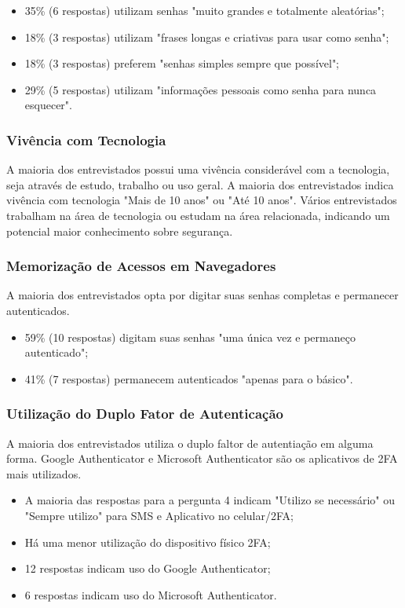 \documentclass[12pt]{article}
\begin{document}
\begin{itemize}
  \item 35\% (6 respostas) utilizam senhas "muito grandes e totalmente aleatórias";
  \item 18\% (3 respostas) utilizam "frases longas e criativas para usar como senha";
  \item 18\% (3 respostas) preferem "senhas simples sempre que possível";
  \item 29\% (5 respostas) utilizam "informações pessoais como senha para nunca esquecer".
\end{itemize}

\subsubsection{Vivência com Tecnologia}

A maioria dos entrevistados possui uma vivência considerável com a tecnologia, seja
através de estudo, trabalho ou uso geral.
A maioria dos entrevistados indica vivência com tecnologia "Mais de 10 anos" ou "Até
10 anos".
Vários entrevistados trabalham na área de tecnologia ou estudam na área relacionada,
indicando um potencial maior conhecimento sobre segurança.

\subsubsection{Memorização de Acessos em Navegadores}

A maioria dos entrevistados opta por digitar suas senhas completas e permanecer autenticados.

\begin{itemize}
  \item 59\% (10 respostas) digitam suas senhas "uma única vez e permaneço autenticado";
  \item 41\% (7 respostas) permanecem autenticados "apenas para o básico".
\end{itemize}

\subsubsection{Utilização do Duplo Fator de Autenticação}

A maioria dos entrevistados utiliza o duplo faltor de autentiação em alguma forma.
Google Authenticator e Microsoft Authenticator são os aplicativos de 2FA mais utilizados.

\begin{itemize}
  \item A maioria das respostas para a pergunta 4 indicam "Utilizo se necessário" ou
  "Sempre utilizo" para SMS e Aplicativo no celular/2FA;
  \item Há uma menor utilização do dispositivo físico 2FA;
  \item 12 respostas indicam uso do Google Authenticator;
  \item 6 respostas indicam uso do Microsoft Authenticator.
\end{itemize}
\end{document}

